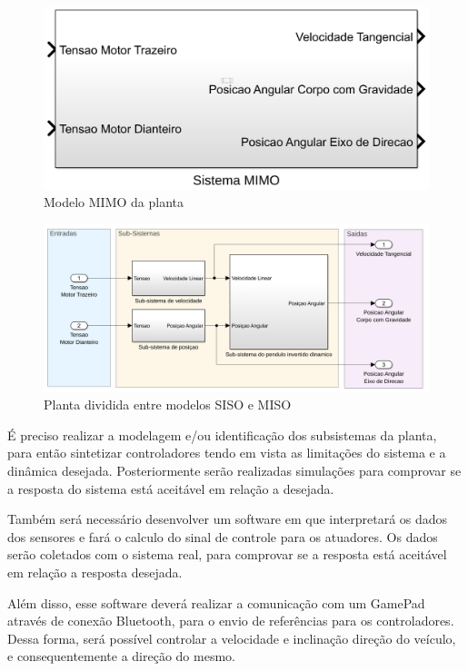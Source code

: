 \documentclass[conference,harvard,brazil,english]{sbatex}
\begin{document}
        \begin{figure}[!htb] 
            \centering
            \includegraphics[width=0.7\columnwidth]{imagens/sistema_mimo.png}{
            \small
            \centering
            \caption{Modelo MIMO da planta}
            \label{sistema_mimo}}
        \end{figure}
        
        \begin{figure}[!htb] 
        \centering \includegraphics[width=\columnwidth]{imagens/sistema_sub.png}{
            \small
            \centering
            \caption{Planta dividida entre modelos SISO e MISO}
            \label{sistema_sub}}
        \end{figure}
        
        É preciso realizar a modelagem e/ou identificação dos subsistemas da planta, para então sintetizar controladores tendo em vista as limitações do sistema e a dinâmica desejada. Posteriormente serão realizadas simulações para comprovar se a resposta do sistema está aceitável em relação a desejada.
        
       Também será necessário desenvolver um software em que interpretará os dados dos sensores e fará o calculo do sinal de controle para os atuadores. Os dados serão coletados com o sistema real, para comprovar se a resposta está aceitável em relação a resposta desejada.
       
       Além disso, esse software deverá realizar a comunicação com um GamePad através de conexão Bluetooth, para o envio de referências para os controladores. Dessa forma, será possível controlar a velocidade e inclinação direção do veículo, e consequentemente a direção do mesmo. 
        
\end{document}

